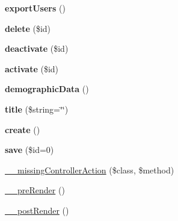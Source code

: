 \begin{DoxyCompactItemize}
\item 
\hypertarget{class_dashboard_controller_aa41d2d79ec03bbc895326201d782a449}{
{\bfseries exportUsers} ()}
\label{class_dashboard_controller_aa41d2d79ec03bbc895326201d782a449}

\item 
\hypertarget{class_dashboard_controller_a2f8258add505482d7f00ea26493a5723}{
{\bfseries delete} (\$id)}
\label{class_dashboard_controller_a2f8258add505482d7f00ea26493a5723}

\item 
\hypertarget{class_dashboard_controller_a97f352d86bb81ef54918dafeab55d61b}{
{\bfseries deactivate} (\$id)}
\label{class_dashboard_controller_a97f352d86bb81ef54918dafeab55d61b}

\item 
\hypertarget{class_dashboard_controller_af791d378562dc8fac6b2550bb13da0ba}{
{\bfseries activate} (\$id)}
\label{class_dashboard_controller_af791d378562dc8fac6b2550bb13da0ba}

\item 
\hypertarget{class_dashboard_controller_ae3c7a0e5f4f45e37c4d723a4eb22dd4f}{
{\bfseries demographicData} ()}
\label{class_dashboard_controller_ae3c7a0e5f4f45e37c4d723a4eb22dd4f}

\item 
\hypertarget{class_table_controller_a09086607bdf0caa184393e8fa08a55bc}{
{\bfseries title} (\$string=\char`\"{}\char`\"{})}
\label{class_table_controller_a09086607bdf0caa184393e8fa08a55bc}

\item 
\hypertarget{class_table_controller_a435e7d7525d4bcd0ed5e34a469f3adf6}{
{\bfseries create} ()}
\label{class_table_controller_a435e7d7525d4bcd0ed5e34a469f3adf6}

\item 
\hypertarget{class_table_controller_a1a4fb85b713fd3fae33e237428c918f3}{
{\bfseries save} (\$id=0)}
\label{class_table_controller_a1a4fb85b713fd3fae33e237428c918f3}

\item 
\hyperlink{class_controller_a728c573e418d1f979340a4669524cacd}{\_\-\_\-missingControllerAction} (\$class, \$method)
\item 
\hyperlink{class_controller_ad86994d2463ea27cab892176e6509bdb}{\_\-\_\-preRender} ()
\item 
\hyperlink{class_controller_adc3c9cc4788f7ba7d1368fdc43568b1d}{\_\-\_\-postRender} ()
\end{DoxyCompactItemize}
